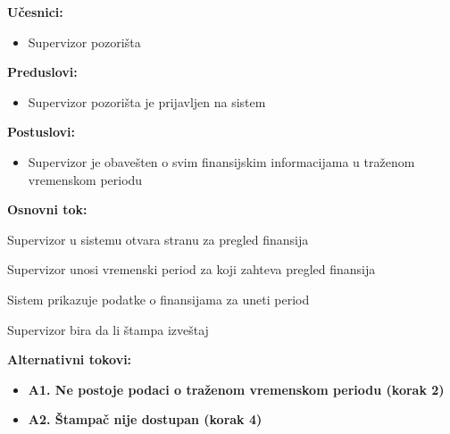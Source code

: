 \documentclass[a4paper]{article}
\begin{document}
\noindent\textbf{Učesnici:} 
\begin{itemize}
  \item Supervizor pozorišta
\end{itemize}

\noindent\textbf{Preduslovi:} 
\begin{itemize}
  \item Supervizor pozorišta je prijavljen na sistem
\end{itemize}

\noindent\textbf{Postuslovi:} 
\begin{itemize}
  \item Supervizor je obavešten o svim finansijskim informacijama u traženom vremenskom periodu
\end{itemize}

\noindent\textbf{Osnovni tok:} 
\begin{legal}
  \item Supervizor u sistemu otvara stranu za pregled finansija
  \item Supervizor unosi vremenski period za koji zahteva pregled finansija
  \item Sistem prikazuje podatke o finansijama za uneti period
  \item Supervizor bira da li štampa izveštaj
\end{legal}

\noindent\textbf{Alternativni tokovi:}
\begin{itemize}
  \item \textbf{A1. Ne postoje podaci o traženom vremenskom periodu (korak 2)} 

  \item \textbf{A2. Štampač nije dostupan (korak 4)} 
\end{itemize}
\end{document}
